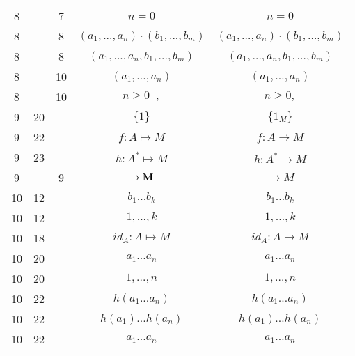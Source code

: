 \documentclass[a4paper,11pt]{article}
\begin{document}
\begin{center}
\begin{tabular}{|c|c|c|c|c|}
    8  & &  7 & $n \!\! = \!\! 0$ & $n = 0$ \\
    8  & &  8 & $( a_{ 1 }, ..., a_{ n } ) \cdot ( b_{ 1 }, ..., b_{ m } )$
           & $( a_{ 1 }, \ldots, a_{ n } ) \cdot ( b_{ 1 }, \ldots, b_{ m } )$ \\
    8  & &  8 & $( a_{ 1 }, ..., a_{ n }, b_{ 1 }, ..., b_{ m } )$
           & $( a_{ 1 }, \ldots, a_{ n }, b_{ 1 }, \ldots, b_{ m } )$ \\
    8  & & 10 & $( a_{ 1 }, ..., a_{ n } )$ & $( a_{ 1 }, \ldots, a_{ n } )$ \\
    8  & & 10 & $n \geq 0\;\;,$ & $n \geq 0,$ \\
    9  & 20 & & $\{ 1 \}$ & $\{ 1_{ M } \}$ \\
    9  & 22 & & $f : A \mapsto M$ & $f : A \to M$ \\
    9  & 23 & & $h : A^{ * } \mapsto M$ & $h : A^{ * } \to M$ \\
    9  & &  9 & $\to \textrm{\textbf{M}}$ & $\to M$ \\
    10 & 12 & & $b_{ 1 } ... b_{ k }$ & $b_{ 1 } \ldots b_{ k }$ \\
    10 & 12 & & $1, ..., k$ & $1, \ldots, k$ \\
    10 & 18 & & $id_{ A } : A \mapsto M$ & $id_{ A } : A \to M$ \\
    10 & 20 & & $a_{ 1 } ... a_{ n }$ & $a_{ 1 } \ldots a_{ n }$ \\
    10 & 20 & & $1, ..., n$ & $1, \ldots, n$ \\
    10 & 22 & & $h( a_{ 1 } ... a_{ n } )$ & $h( a_{ 1 } \ldots a_{ n } )$ \\
    10 & 22 & & $h( a_{ 1 } ) ... h( a_{ n } )$
           & $h( a_{ 1 } ) \ldots h( a_{ n } )$ \\
    10 & 22 & & $a_{ 1 } ... a_{ n }$ & $a_{ 1 } \ldots a_{ n }$ \\
    \hline
  \end{tabular}





  \newpage


\end{center}
\end{document}
